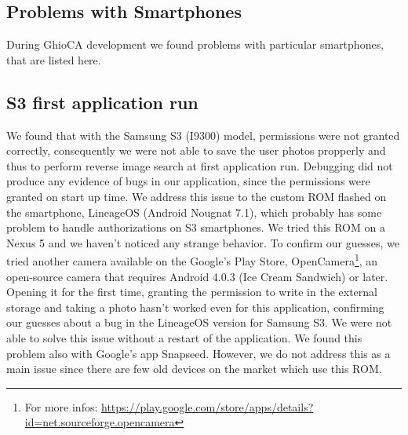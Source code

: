 \subsection{Problems with Smartphones}

During GhioCA development we found problems with particular smartphones, that
are listed here.

\subsection{S3 first application run}

We found that with the Samsung S3 (I9300) model, permissions were not granted
correctly, consequently we were not able to save the user photos propperly and 
thus to perform reverse image search at first application run. Debugging did
not produce any evidence of bugs in our application, since the permissions were
granted on start up time.
We address this issue to the custom ROM flashed on the smartphone, LineageOS
(Android Nougnat 7.1), which probably has some problem to handle authorizations
on S3 smartphones. We tried this ROM on a Nexus 5 and we haven't noticed any
strange behavior.
To confirm our guesses, we tried another camera available on the Google's Play
Store, OpenCamera\footnote{For more infos:
\url{https://play.google.com/store/apps/details?id=net.sourceforge.opencamera}},
 an open-source camera that requires Android 4.0.3 (Ice Cream Sandwich) or
later.
Opening it for the first time, granting the permission to write in the external
storage and taking a photo hasn't worked even for this application, confirming
our guesses about a bug in the LineageOS version for Samsung S3.
We were not able to solve this issue without a restart of the application.
We found this problem also with Google's app Snapseed.
However, we do not address this as a main issue since there are few old devices
on the market which use this ROM.
